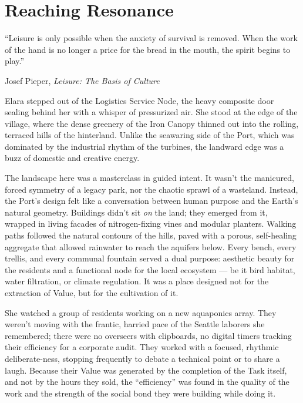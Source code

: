 \chapter{Reaching Resonance}
\label{chap:05}

\epigraph{“Leisure is only possible when the anxiety of survival is removed. When the work of the hand is no longer a price for the bread in the mouth, the spirit begins to play.”}{Josef Pieper, \textit{Leisure: The Basis of Culture}}


Elara stepped out of the Logistics Service Node, the heavy composite door sealing behind her with a whisper of pressurized air. She stood at the edge of the village, where the dense greenery of the Iron Canopy thinned out into the rolling, terraced hills of the hinterland. Unlike the seawaring side of the Port, which was dominated by the industrial rhythm of the turbines, the landward edge was a buzz of domestic and creative energy.

The landscape here was a masterclass in guided intent. It wasn't the manicured, forced symmetry of a legacy park, nor the chaotic sprawl of a wasteland. Instead, the Port's design felt like a conversation between human purpose and the Earth's natural geometry. Buildings didn't sit \textit{on} the land; they emerged from it, wrapped in living facades of nitrogen-fixing vines and modular planters. Walking paths followed the natural contours of the hills, paved with a porous, self-healing aggregate that allowed rainwater to reach the aquifers below. Every bench, every trellis, and every communal fountain served a dual purpose: aesthetic beauty for the residents and a functional node for the local ecosystem — be it bird habitat, water filtration, or climate regulation. It was a place designed not for the extraction of Value, but for the cultivation of it.

She watched a group of residents working on a new aquaponics array. They weren't moving with the frantic, harried pace of the Seattle laborers she remembered; there were no overseers with clipboards, no digital timers tracking their efficiency for a corporate audit. They worked with a focused, rhythmic deliberate-ness, stopping frequently to debate a technical point or to share a laugh. Because their Value was generated by the completion of the Task itself, and not by the hours they sold, the ``efficiency'' was found in the quality of the work and the strength of the social bond they were building while doing it. 

